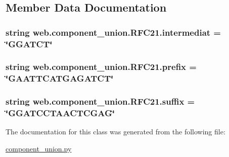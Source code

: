 \subsection{Member Data Documentation}
\hypertarget{classweb_1_1component__union_1_1_r_f_c21_a64e75fe85791a49cae4b9daec3e0b61c}{
\subsubsection[{intermediat}]{\setlength{\rightskip}{0pt plus 5cm}string web.\-component\-\_\-union.\-R\-F\-C21.\-intermediat = \char`\"{}G\-G\-A\-T\-C\-T\char`\"{}\hspace{0.3cm}{\ttfamily [static]}}}\label{classweb_1_1component__union_1_1_r_f_c21_a64e75fe85791a49cae4b9daec3e0b61c}
\hypertarget{classweb_1_1component__union_1_1_r_f_c21_ad8cf78991352d8d2df4462d4911b0f08}{
\subsubsection[{prefix}]{\setlength{\rightskip}{0pt plus 5cm}string web.\-component\-\_\-union.\-R\-F\-C21.\-prefix = \char`\"{}G\-A\-A\-T\-T\-C\-A\-T\-G\-A\-G\-A\-T\-C\-T\char`\"{}\hspace{0.3cm}{\ttfamily [static]}}}\label{classweb_1_1component__union_1_1_r_f_c21_ad8cf78991352d8d2df4462d4911b0f08}
\hypertarget{classweb_1_1component__union_1_1_r_f_c21_a17f59e8a9402a61bbe4e1943c74068fc}{
\subsubsection[{suffix}]{\setlength{\rightskip}{0pt plus 5cm}string web.\-component\-\_\-union.\-R\-F\-C21.\-suffix = \char`\"{}G\-G\-A\-T\-C\-C\-T\-A\-A\-C\-T\-C\-G\-A\-G\char`\"{}\hspace{0.3cm}{\ttfamily [static]}}}\label{classweb_1_1component__union_1_1_r_f_c21_a17f59e8a9402a61bbe4e1943c74068fc}


The documentation for this class was generated from the following file\-:\begin{DoxyCompactItemize}
\item 
\hyperlink{component__union_8py}{component\-\_\-union.\-py}\end{DoxyCompactItemize}

